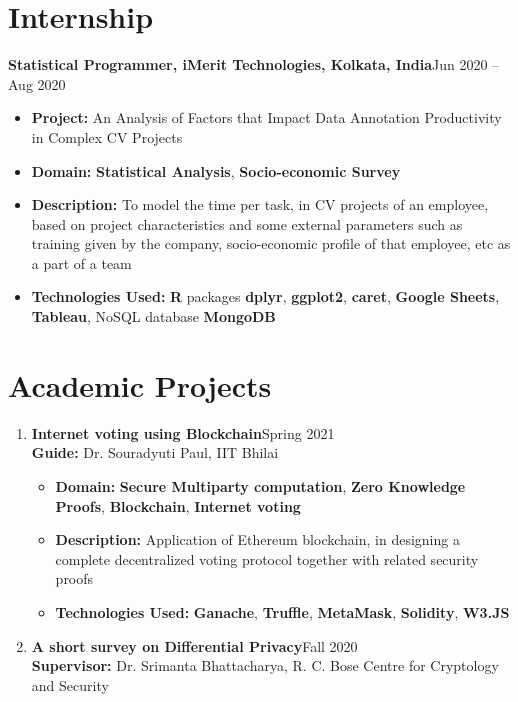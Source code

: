 \documentclass[margin,line]{res}
\begin{document}
\begin{resume}
\section{\sc Internship}
{\bf Statistical Programmer, iMerit Technologies, Kolkata, India}\hfill{Jun 2020 -- Aug 2020}
\begin{itemize}
\item \textbf{Project:} An Analysis of Factors that Impact Data Annotation Productivity in Complex CV Projects
\item \textbf{Domain:} \textbf{Statistical Analysis}, \textbf{Socio-economic Survey}
\item \textbf{Description:} To model the time per task, in CV projects of an employee, based on project characteristics and some external parameters such as training given by the company, socio-economic profile of that employee, etc as a part of a team
\item \textbf{Technologies Used:} \textbf{R} packages \textbf{dplyr}, \textbf{ggplot2}, \textbf{caret}, \textbf{Google Sheets}, \textbf{Tableau}, NoSQL database \textbf{MongoDB}
\end{itemize}

\section{\sc Academic Projects}
\begin{enumerate}
\item {\bf Internet voting using Blockchain}\hfill{Spring 2021}\\
\textbf{Guide:} Dr. Souradyuti Paul, IIT Bhilai
\begin{itemize}
\item \textbf{Domain:} \textbf{Secure Multiparty computation}, \textbf{Zero Knowledge Proofs}, \textbf{Blockchain}, \textbf{Internet voting}
\item \textbf{Description:} Application of Ethereum blockchain, in designing a complete decentralized voting protocol together with related security proofs
\item \textbf{Technologies Used:} \textbf{Ganache}, \textbf{Truffle}, \textbf{MetaMask}, \textbf{Solidity}, \textbf{W3.JS}
\end{itemize}

\item {\bf A short survey on Differential Privacy}\hfill{Fall 2020}\\
\textbf{Supervisor:} Dr. Srimanta Bhattacharya, R. C. Bose Centre for Cryptology and Security


\end{enumerate}
\end{resume}
\end{document}
